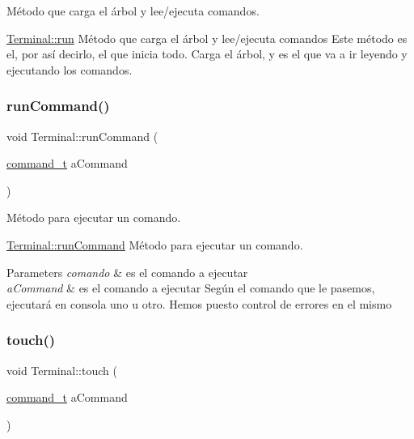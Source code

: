 Método que carga el árbol y lee/ejecuta comandos. 

\hyperlink{classTerminal_ac822276bd11e19db71d1b1410333c3c7}{Terminal\+::run} Método que carga el árbol y lee/ejecuta comandos Este método es el, por así decirlo, el que inicia todo. Carga el árbol, y es el que va a ir leyendo y ejecutando los comandos. \mbox{\label{classTerminal_a01d8fd8ffa9866b5355e65dc2582dc6a}} 
\subsubsection{\texorpdfstring{run\+Command()}{runCommand()}}
{\footnotesize\ttfamily void Terminal\+::run\+Command (\begin{DoxyParamCaption}\item[{\hyperlink{structcommand__t}{command\+\_\+t}}]{a\+Command }\end{DoxyParamCaption})}



Método para ejecutar un comando. 

\hyperlink{classTerminal_a01d8fd8ffa9866b5355e65dc2582dc6a}{Terminal\+::run\+Command} Método para ejecutar un comando.


\begin{DoxyParams}{Parameters}
{\em comando} & es el comando a ejecutar\\
\hline
{\em a\+Command} & es el comando a ejecutar Según el comando que le pasemos, ejecutará en consola uno u otro. Hemos puesto control de errores en el mismo \\
\hline
\end{DoxyParams}
\mbox{\label{classTerminal_a8b0df976ff03c2dfd4cc36a99cad54e2}} 
\subsubsection{\texorpdfstring{touch()}{touch()}}
{\footnotesize\ttfamily void Terminal\+::touch (\begin{DoxyParamCaption}\item[{\hyperlink{structcommand__t}{command\+\_\+t}}]{a\+Command }\end{DoxyParamCaption})}



